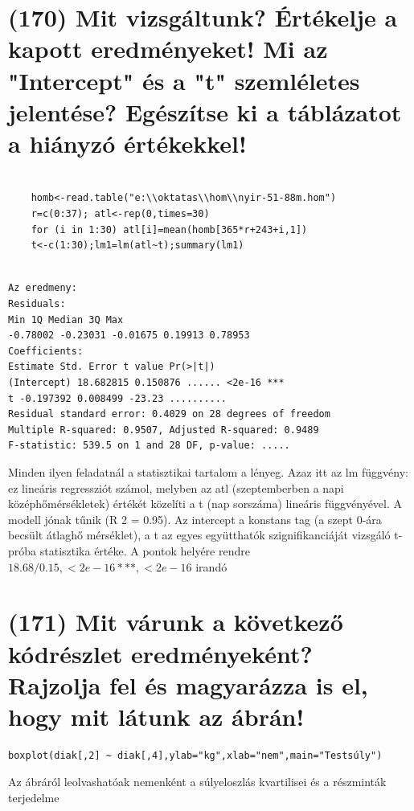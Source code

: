 \documentclass[12p]{article}
\begin{document}
\section{(170) Mit vizsgáltunk? Értékelje a kapott eredményeket! Mi az "Intercept" és a "t" szemléletes
jelentése? Egészítse ki a táblázatot a hiányzó értékekkel!}

\begin{verbatim}

	homb<-read.table("e:\\oktatas\\hom\\nyir-51-88m.hom")
	r=c(0:37); atl<-rep(0,times=30)
	for (i in 1:30) atl[i]=mean(homb[365*r+243+i,1])
	t<-c(1:30);lm1=lm(atl~t);summary(lm1)
	
\end{verbatim}
\begin{verbatim}
Az eredmeny:
Residuals:
Min 1Q Median 3Q Max
-0.78002 -0.23031 -0.01675 0.19913 0.78953
Coefficients:
Estimate Std. Error t value Pr(>|t|)
(Intercept) 18.682815 0.150876 ...... <2e-16 ***
t -0.197392 0.008499 -23.23 ..........
Residual standard error: 0.4029 on 28 degrees of freedom
Multiple R-squared: 0.9507, Adjusted R-squared: 0.9489
F-statistic: 539.5 on 1 and 28 DF, p-value: .....
\end{verbatim}

Minden ilyen feladatnál a statisztikai tartalom a lényeg. Azaz itt az lm függvény: ez
lineáris regressziót számol, melyben az atl (szeptemberben a napi középhőmérsékletek) értékét közelíti a t (nap sorszáma) lineáris függvényével. A modell jónak tűnik (R
2 = 0.95). Az
intercept a konstans tag (a szept 0-ára becsült átlaghő mérséklet), a t az egyes együtthatók
szignifikanciáját vizsgáló t-próba statisztika értéke. A pontok helyére rendre $18.68/0.15, < 2e - 16 ***,
< 2e - 16$ irandó


\section{(171) Mit várunk a következő kódrészlet eredményeként? Rajzolja fel és magyarázza is el, hogy
mit látunk az ábrán!}

\begin{verbatim}
boxplot(diak[,2] ~ diak[,4],ylab="kg",xlab="nem",main="Testsúly")
\end{verbatim}

Az ábráról leolvashatóak nemenként a súlyeloszlás kvartilisei és a részminták terjedelme
\end{document}
